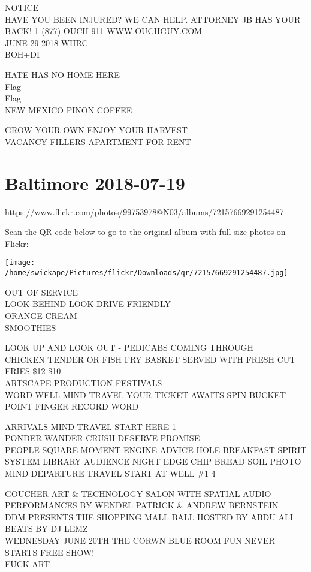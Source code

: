 \documentclass[10pt,letterpaper]{article}
\begin{document}
NOTICE\\
HAVE YOU BEEN INJURED?  WE CAN HELP.  ATTORNEY JB HAS YOUR BACK!  1 (877) OUCH{-}911 WWW.OUCHGUY.COM\\
JUNE 29 2018 WHRC\\
BOH+DI

HATE HAS NO HOME HERE\\
Flag\\
Flag\\
NEW MEXICO PINON COFFEE

GROW YOUR OWN ENJOY YOUR HARVEST\\
VACANCY FILLERS APARTMENT FOR RENT


\section*{Baltimore 2018-07-19}

\url{https://www.flickr.com/photos/99753978@N03/albums/72157669291254487}

Scan the QR code below to go to the original album with full-size photos on Flickr:

\texttt{[image: /home/swickape/Pictures/flickr/Downloads/qr/72157669291254487.jpg]}


OUT OF SERVICE\\
LOOK BEHIND LOOK DRIVE FRIENDLY\\
ORANGE CREAM\\
SMOOTHIES

LOOK UP AND LOOK OUT {-} PEDICABS COMING THROUGH\\
CHICKEN TENDER OR FISH FRY BASKET SERVED WITH FRESH CUT FRIES \$12 \$10\\
ARTSCAPE PRODUCTION FESTIVALS\\
WORD WELL MIND TRAVEL YOUR TICKET AWAITS SPIN BUCKET POINT FINGER RECORD WORD

ARRIVALS MIND TRAVEL START HERE 1\\
PONDER WANDER CRUSH DESERVE PROMISE\\
PEOPLE SQUARE MOMENT ENGINE ADVICE HOLE BREAKFAST SPIRIT SYSTEM LIBRARY AUDIENCE NIGHT EDGE CHIP BREAD SOIL PHOTO\\
MIND DEPARTURE TRAVEL START AT WELL \#1 4

GOUCHER ART \& TECHNOLOGY SALON WITH SPATIAL AUDIO PERFORMANCES BY WENDEL PATRICK \& ANDREW BERNSTEIN\\
DDM PRESENTS THE SHOPPING MALL BALL HOSTED BY ABDU ALI BEATS BY DJ LEMZ\\
WEDNESDAY JUNE 20TH THE CORWN BLUE ROOM FUN NEVER STARTS FREE SHOW!\\
FUCK ART
\end{document}
